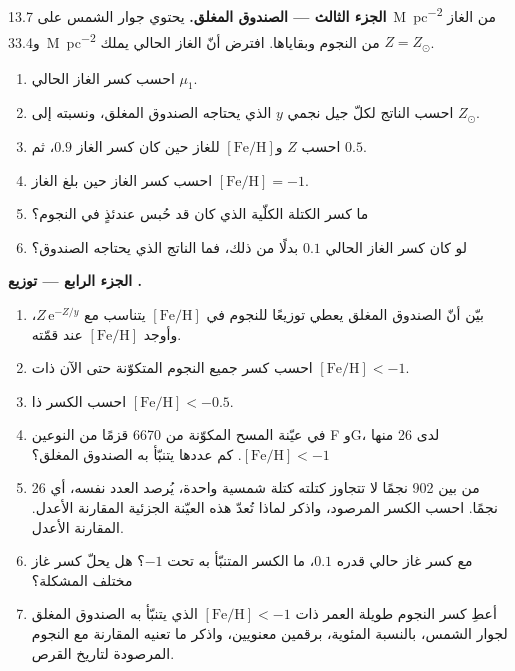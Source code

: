 \begin{problem}
\medskip\noindent\textbf{الجزء الثالث --- الصندوق المغلق.} يحتوي جوار
الشمس على \qty{13.7}{M_\odot.pc^{-2}} من الغاز
و\qty{33.4}{M_\odot.pc^{-2}} من النجوم وبقاياها. افترض أنّ
الغاز الحالي يملك $Z = Z_\odot$.
\begin{enumerate}[resume]
\item احسب كسر الغاز الحالي $\mu_1$.
\item احسب الناتج لكلّ جيل نجمي $y$ الذي يحتاجه
  الصندوق المغلق، ونسبته إلى $Z_\odot$.
\item احسب $Z$ و$[\mathrm{Fe/H}]$ للغاز حين كان كسر الغاز
  $0.9$، ثم $0.5$.
\item احسب كسر الغاز حين بلغ الغاز
  $[\mathrm{Fe/H}] = -1$.
\item ما كسر الكتلة الكلّية الذي كان قد حُبس عندئذٍ في النجوم؟
\item لو كان كسر الغاز الحالي $0.1$ بدلًا من ذلك، فما الناتج الذي
  يحتاجه الصندوق؟
\end{enumerate}

\medskip\noindent\textbf{الجزء الرابع --- توزيع .}
\begin{enumerate}[resume]
\item بيّن أنّ الصندوق المغلق يعطي توزيعًا للنجوم في
  $[\mathrm{Fe/H}]$ يتناسب مع $Z\,\mathrm{e}^{-Z/y}$، وأوجد
  $[\mathrm{Fe/H}]$ عند قمّته.
\item احسب كسر جميع النجوم المتكوّنة حتى الآن ذات
  $[\mathrm{Fe/H}] < -1$.
\item احسب الكسر ذا $[\mathrm{Fe/H}] < -0.5$.
\item في عيّنة المسح المكوّنة من 6670 قزمًا من النوعين F وG، لدى 26 منها
  $[\mathrm{Fe/H}] < -1$. كم عددها يتنبّأ به الصندوق المغلق؟
\item من بين 902 نجمًا لا تتجاوز كتلته كتلة شمسية واحدة، يُرصد العدد نفسه،
  أي 26 نجمًا. احسب الكسر المرصود، واذكر لماذا تُعدّ هذه العيّنة الجزئية المقارنة الأعدل.
  المقارنة الأعدل.
\item مع كسر غاز حالي قدره $0.1$، ما الكسر المتنبّأ به
  تحت $-1$؟ هل يحلّ كسر غاز مختلف
  المشكلة؟
\item أعطِ كسر النجوم طويلة العمر ذات $[\mathrm{Fe/H}] < -1$
  الذي يتنبّأ به الصندوق المغلق لجوار الشمس، بالنسبة المئوية،
  برقمين معنويين، واذكر ما تعنيه المقارنة مع
  النجوم المرصودة لتاريخ القرص.
\end{enumerate}
\end{problem}
